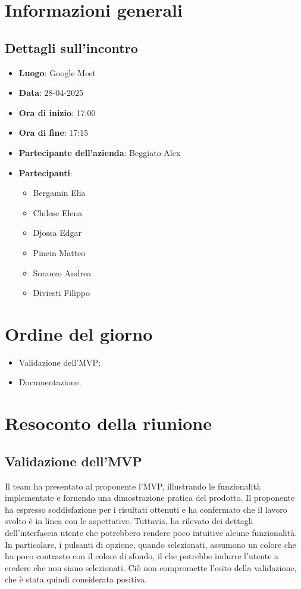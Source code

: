 \section{Informazioni generali}
\subsection{Dettagli sull'incontro}
\begin{itemize}
    \item \textbf{Luogo}: Google Meet
    \item \textbf{Data}: 28-04-2025
    \item \textbf{Ora di inizio}: 17:00
    \item \textbf{Ora di fine}: 17:15
    \item \textbf{Partecipante dell'azienda}: Beggiato Alex
    \item \textbf{Partecipanti}:
          \begin{itemize}
              \item Bergamin Elia
              \item Chilese Elena
              \item Djossa Edgar
              \item Pincin Matteo
              \item Soranzo Andrea
              \item Diviesti Filippo
          \end{itemize}
\end{itemize}

\section{Ordine del giorno}
\begin{itemize}
    \item Validazione dell'MVP;
    \item Documentazione.
\end{itemize}

\section{Resoconto della riunione}

\subsection{Validazione dell'MVP}
Il team ha presentato al proponente l'MVP, illustrando
le funzionalità implementate e fornendo una dimostrazione pratica del prodotto.
Il proponente ha espresso soddisfazione per i risultati ottenuti e ha
confermato che il lavoro svolto è in linea con le aspettative. Tuttavia, ha
rilevato dei dettagli dell'interfaccia utente che potrebbero rendere
poco intuitive alcune funzionalità. In particolare, i pulsanti di opzione,
quando selezionati, assumono un colore che ha poco contrasto con il colore di
sfondo, il che potrebbe indurre l'utente a credere che non siano selezionati.
Ciò non compromette l'esito della validazione, che è stata quindi considerata
positiva.

